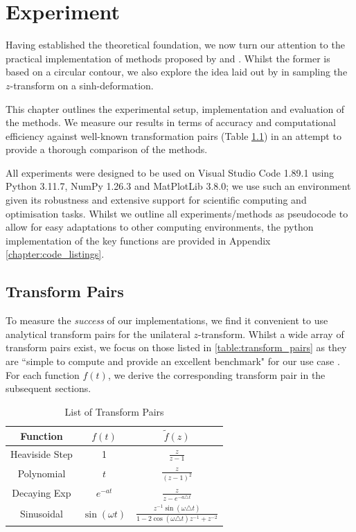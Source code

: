 \documentclass[a4paper]{report}
\begin{document}
\chapter{Experiment}
Having established the theoretical foundation, we now turn our attention to the practical implementation of methods proposed by \citet{AbateWhitt1992a, AbateWhitt1992b} and \citet{Cavers1978FFT}. Whilst the former is based on a circular contour, we also explore the idea laid out by \citet{levendorskii2022sinh} in sampling the $z$-transform on a sinh-deformation.

This chapter outlines the experimental setup, implementation and evaluation of the methods. We measure our results in terms of accuracy and computational efficiency against well-known transformation pairs (Table \ref{table:transform_pairs}) in an attempt to provide a thorough comparison of the methods.

All experiments were designed to be used on Visual Studio Code 1.89.1 using Python 3.11.7, NumPy 1.26.3 and MatPlotLib 3.8.0; we use such an environment given its robustness and extensive support for scientific computing and optimisation tasks. Whilst we outline all experiments/methods as pseudocode to allow for easy adaptations to other computing environments, the python implementation of the key functions are provided in Appendix \ref{chapter:code_listings}.

\section{Transform Pairs}\label{section:transform_pairs}
To measure the \textit{success} of our implementations, we find it convenient to use analytical transform pairs for the unilateral $z$-transform. Whilst a wide array of transform pairs exist, we focus on those listed in \autoref{table:transform_pairs} as they are ``simple to compute and provide an excellent benchmark" for our use case \citep{loveless2021guido}. For each function $f(t)$, we derive the corresponding transform pair in the subsequent sections.

\begin{table}[H]
    \centering
    \renewcommand{\arraystretch}{1.2} %
    \begin{tabular}{c|cc}
    \textbf{Function} & $f(t)$ & $\tilde{f}(z)$ \\
    \hline
    Heaviside Step & 1 & $\frac{z}{z-1}$ \\
    Polynomial & $t$ & $\frac{z}{(z-1)^2}$ \\
    Decaying Exp & $e^{-at}$ & $\frac{z}{z - e^{-a \triangle t}}$ \\
    Sinusoidal & $\sin(\omega t)$ & $\frac{z^{-1}\sin(\omega \triangle t)}{1 - 2\cos(\omega\triangle t)z^{-1} + z^{-2}}$ \\
    \end{tabular}
    
    \caption{List of Transform Pairs}
    \label{table:transform_pairs}
\end{table}
\end{document}
